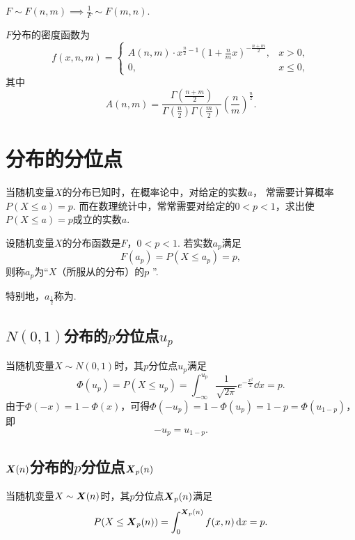 \begin{proposition}
\(F \sim F(n,m) \implies \frac{1}{F} \sim F(m,n)\).
\end{proposition}

\begin{theorem}
\(F\)分布的密度函数为\begin{equation}
	f(x,n,m) = \left\{ \begin{array}{cl}
		A(n,m) \cdot x^{\frac{n}{2}-1}
		\left(1+\frac{n}{m}x\right)^{-\frac{n+m}{2}},
		& x > 0, \\
		0, & x \leq 0,
	\end{array} \right.
\end{equation}
其中\[
	A(n,m)=\frac{
		\Gamma\left(\frac{n+m}{2}\right)
	}{
		\Gamma\left(\frac{n}{2}\right) \Gamma\left(\frac{m}{2}\right)
	}
	\left(\frac{n}{m}\right)^{\frac{n}{2}}.
\]
\end{theorem}

\section{分布的分位点}
当随机变量\(X\)的分布已知时，在概率论中，对给定的实数\(a\)，
常需要计算概率\(P(X \leq a) = p\).
而在数理统计中，常常需要对给定的\(0<p<1\)，求出使\(P(X \leq a) = p\)成立的实数\(a\).

\begin{definition}
设随机变量\(X\)的分布函数是\(F\)，\(0<p<1\).
若实数\(a_p\)满足\[
	F(a_p) = P(X \leq a_p) = p,
\]
则称\(a_p\)为“\(X\)（所服从的分布）的\(p\) ”.

特别地，\(a_{\frac{1}{2}}\)称为.
\end{definition}

\subsection{\texorpdfstring{\(N(0,1)\)分布的\(p\)分位点\(u_p\)}{标准正态分布的p分位点}}
当随机变量\(X \sim N(0,1)\)时，其\(p\)分位点\(u_p\)满足\[
\Phi(u_p)
= P(X \leq u_p)
= \int_{-\infty}^{u_p} \frac{1}{\sqrt{2\pi}} e^{-\frac{x^2}{2}} \dd{x}
= p.
\]由于\(\Phi(-x)=1-\Phi(x)\)，可得\(\Phi(-u_p)=1-\Phi(u_p)=1-p=\Phi(u_{1-p})\)，即\begin{equation}
-u_p=u_{1-p}.
\end{equation}

\subsection{\texorpdfstring{\(\boldsymbol{X}(n)\)分布的\(p\)分位点\(\boldsymbol{X}_p(n)\)}{卡方分布的p分位点}}
当随机变量\(X \sim \boldsymbol{X}(n)\)时，其\(p\)分位点\(\boldsymbol{X}_p(n)\)满足\[
P(X \leq \boldsymbol{X}_p(n)) = \int_0^{\boldsymbol{X}_p(n)} f(x,n) \dd{x} = p.
\]

